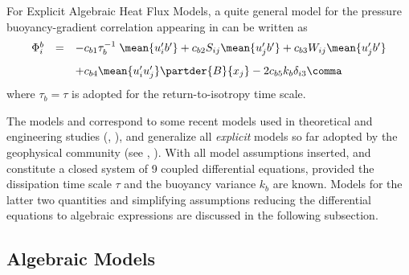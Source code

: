 For Explicit Algebraic Heat Flux Models, a quite general model for the
pressure buoyancy-gradient correlation appearing in 
can be written as
\begin{equation}
  \label{Phib}
  \begin{array}{rcl}
    \Phi^b_i  &=& - c_{b 1} \tau^{-1}_b \; \mean{u'_i b'} 
    + c_{b 2} S_{ij} \mean{u'_j b'} + c_{b 3} W_{ij} \mean{u'_j b'} \\[3mm]
    & & + c_{b 4} \mean{u'_i u'_j} \partder{B}{x_j} - 2 c_{b 5} k_b \delta_{i3}
  \comma
  \end{array}
\end{equation}
where $\tau_b=\tau$ is adopted for the return-to-isotropy time scale.

The models  and  correspond to some recent models
used in theoretical and engineering studies (\cite{Soetal2003a},
\cite{Jinetal2003}), and generalize all \emph{explicit} models so far
adopted by the geophysical community (see \cite{Burchard2002a},
\cite{BurchardBolding2001}). With all model assumptions inserted,
 and  constitute a closed system of 9 coupled
differential equations, provided the dissipation time scale $\tau$ and 
the buoyancy variance $k_b$ are known. Models for the latter two quantities
and simplifying assumptions reducing the differential equations to
algebraic expressions are discussed in the following subsection.


\subsection{Algebraic Models\label{sec:ASM}}


